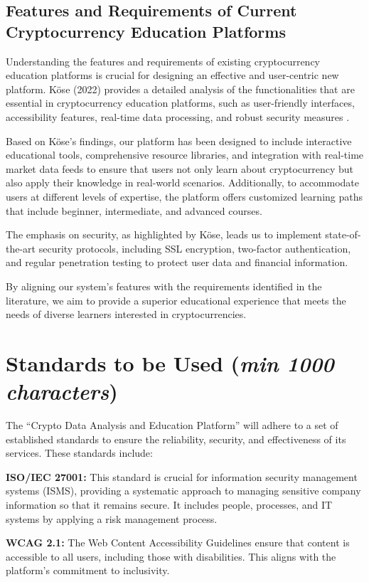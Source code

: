 \documentclass[12pt]{report}
\newcommand{\characters}[1]{(\textit{min #1 characters})}
\begin{document}
\subsection{Features and Requirements of Current Cryptocurrency Education Platforms}
Understanding the features and requirements of existing cryptocurrency education platforms is crucial for designing an effective and user-centric new platform. Köse (2022) provides a detailed analysis of the functionalities that are essential in cryptocurrency education platforms, such as user-friendly interfaces, accessibility features, real-time data processing, and robust security measures \cite{kose2022}. 

Based on Köse's findings, our platform has been designed to include interactive educational tools, comprehensive resource libraries, and integration with real-time market data feeds to ensure that users not only learn about cryptocurrency but also apply their knowledge in real-world scenarios. Additionally, to accommodate users at different levels of expertise, the platform offers customized learning paths that include beginner, intermediate, and advanced courses.

The emphasis on security, as highlighted by Köse, leads us to implement state-of-the-art security protocols, including SSL encryption, two-factor authentication, and regular penetration testing to protect user data and financial information.

By aligning our system's features with the requirements identified in the literature, we aim to provide a superior educational experience that meets the needs of diverse learners interested in cryptocurrencies.


\section{Standards to be Used \characters{1000}}
The ``Crypto Data Analysis and Education Platform'' will adhere to a set of established standards to ensure the reliability, security, and effectiveness of its services. These standards include:

\textbf{ISO/IEC 27001:} This standard is crucial for information security management systems (ISMS), providing a systematic approach to managing sensitive company information so that it remains secure. It includes people, processes, and IT systems by applying a risk management process.

\textbf{WCAG 2.1:} The Web Content Accessibility Guidelines ensure that content is accessible to all users, including those with disabilities. This aligns with the platform's commitment to inclusivity.
\end{document}
